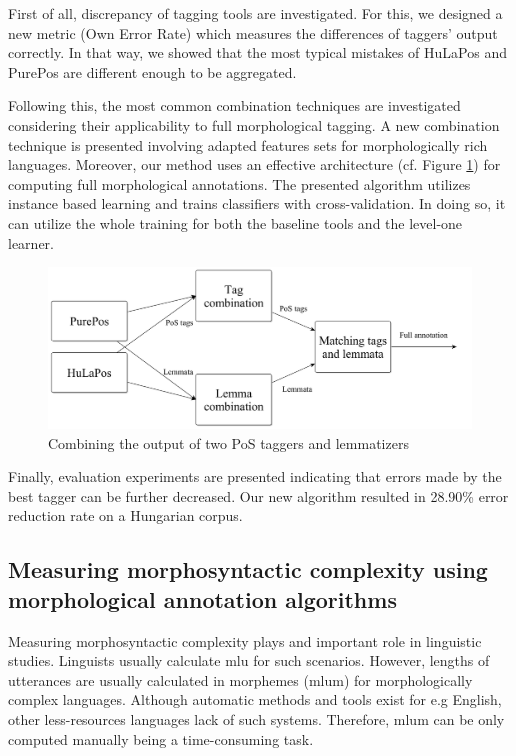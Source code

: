 First of all, discrepancy of tagging tools are investigated. 
For this, we designed a new metric (Own Error Rate) which measures the differences of taggers' output correctly.
In that way, we showed that the most typical mistakes of HuLaPos and PurePos are different enough to be aggregated.

Following this, the most common combination techniques are investigated considering their applicability to full morphological tagging.
A new combination technique is presented involving adapted features sets for morphologically rich languages.
Moreover, our method uses an effective architecture (cf. Figure \ref{fig:comb3_en}) for computing full morphological annotations.
The presented algorithm utilizes instance based learning \cite{Aha1991} and trains classifiers with cross-validation.
In doing so, it can utilize the whole training for both the baseline tools and the level-one learner.

\begin{figure}[H]
  \centering
  \includegraphics[scale=0.17]{MorphTagging/comb3.png} 
  \caption{Combining the output of two PoS taggers and lemmatizers}
  \label{fig:comb3_en}
\end{figure}


Finally, evaluation experiments are presented indicating that errors made by the best tagger can be further decreased.
Our new algorithm resulted in 28.90\% error reduction rate on a Hungarian corpus.

\subsection{Measuring morphosyntactic complexity using morphological annotation algorithms}
\label{thes:mlu}

Measuring morphosyntactic complexity plays and important role in linguistic studies.
Linguists usually calculate \acrlong{mlu} for such scenarios.
However, lengths of utterances are usually calculated in morphemes (\acrshort{mlum}) for morphologically complex languages.
Although automatic methods and tools exist for e.g English, other less-resources languages lack of such systems.
Therefore, \acrshort{mlum} can be only computed manually being a time-consuming task.

